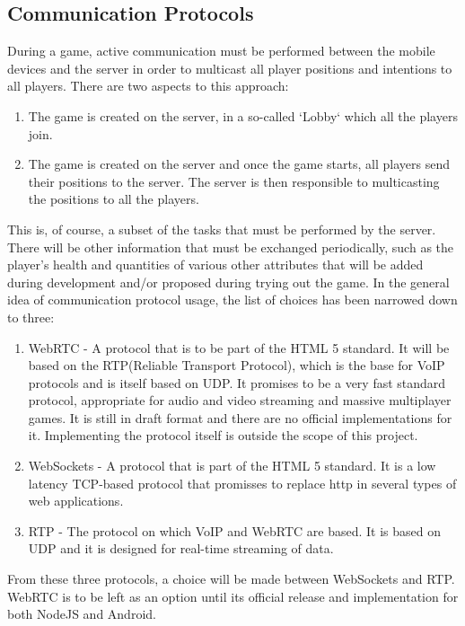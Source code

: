 \documentclass{article}
\begin{document}
\subsection{Communication Protocols}
During a game, active communication must be performed between the mobile devices
and the server in order to multicast all player positions and intentions to all
players. There are two aspects to this approach:

\begin{enumerate}
	\item The game is created on the server, in a so-called `Lobby` which all the
	players join.
	\item The game is created on the server and once the game starts, all players send
	their positions to the server. The server is then responsible to multicasting
	the positions to all the players. 
\end{enumerate}

This is, of course, a subset of the tasks that must be performed by the server.
There will be other information that must be exchanged periodically, such as the
player's health and quantities of various other attributes that will be added
during development and/or proposed during trying out the game. In the general
idea of communication protocol usage, the list of choices has been narrowed down
to three:

\begin{enumerate}
	\item WebRTC - A protocol that is to be part of the HTML 5 standard. It will be
	based on the RTP(Reliable Transport Protocol), which is the base for VoIP
	protocols and is itself based on UDP. It promises to be a very fast standard
	protocol, appropriate for audio and video streaming and massive multiplayer
	games.\cite{webrtc} It is still in draft format and there are no official
	implementations for it. Implementing the protocol itself is outside the scope
	of this project.
	\item WebSockets - A protocol that is part of the HTML 5 standard. It is a low
	latency TCP-based protocol that promisses to replace http in several types of
	web applications.\cite{websockets}
	\item RTP - The protocol on which VoIP and WebRTC are based. It is based on UDP
	and it is designed for real-time streaming of data.\cite{rtp}
\end{enumerate}

From these three protocols, a choice will be made between WebSockets and RTP.
WebRTC is to be left as an option until its official release and implementation
for both NodeJS and Android.
\end{document}
